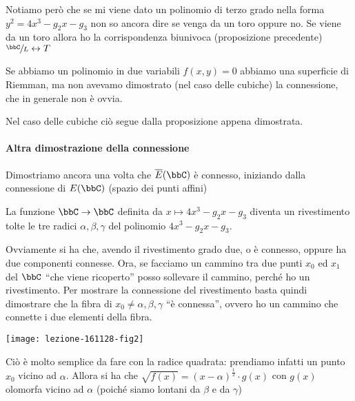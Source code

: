 \begin{osservazione}
  Notiamo però che se mi viene dato un polinomio di terzo grado nella
  forma $y^2 = 4x^3 - g_2 x - g_3$ non so ancora dire se venga da un
  toro oppure no. Se viene da un toro allora ho la corrispondenza
  biunivoca (proposizione precedente) $\sfrac{\bbC}{L} \leftrightarrow T$
\end{osservazione}

\begin{osservazione}
  Se abbiamo un polinomio in due variabili $f(x, y) = 0$ abbiamo una
  superficie di Riemman, ma non avevamo dimostrato (nel caso delle
  cubiche) la connessione, che in generale non è ovvia.

  Nel caso delle cubiche ciò segue dalla proposizione appena dimostrata.
\end{osservazione}

\paragraph{Altra dimostrazione della connessione} Dimostriamo ancora una
volta che $\ol{E}(\bbC)$ è connesso, iniziando dalla connessione di
$E(\bbC)$ (spazio dei punti affini)

La funzione $\bbC \rar \bbC$ definita da $x \mapsto 4x^3 - g_2 x - g_3$
diventa un rivestimento tolte le tre radici $\alpha, \beta, \gamma$ del
polinomio $4x^3 - g_2 x - g_3$.


Ovviamente si ha che, avendo il rivestimento grado due, o è connesso,
oppure ha due componenti connesse. Ora, se facciamo un cammino tra due
punti $x_0$ ed $x_1$ del $\bbC$ ``che viene ricoperto'' posso sollevare
il cammino, perché ho un rivestimento. Per mostrare la connessione del
rivestimento basta quindi dimostrare che la fibra di $x_0 \neq \alpha,
\beta, \gamma$ ``è connessa'', ovvero ho un cammino che connette i due
elementi della fibra.

\begin{center}
  \texttt{[image: lezione-161128-fig2]}
\end{center}

Ciò è molto semplice da fare con la radice quadrata: prendiamo infatti
un punto $x_0$ vicino ad $\alpha$. Allora si ha che
$\sqrt{f(x)} = (x - \alpha)^{\frac{1}{2}} \cdot g(x)$ con $g(x)$
olomorfa vicino ad $\alpha$ (poiché siamo lontani da $\beta$ e da
$\gamma$)

